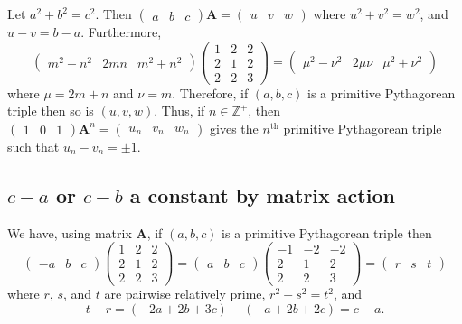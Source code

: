 \documentclass{article}
\theoremstyle{definition}
\begin{document}
Let \(a^2+b^2=c^2\). Then \( \begin{pmatrix}a&b&c\end{pmatrix}\mathbf{A}=\begin{pmatrix}u&v&w\end{pmatrix}\) where \(u^2+v^2=w^2\), and \(u-v=b-a\). Furthermore,\[ \begin{pmatrix}
m^2-n^2&2mn&m^2+n^2
\end{pmatrix}\begin{pmatrix} 1 & 2 & 2 \\ 2 & 1 & 2 \\ 2 & 2 & 3 \end{pmatrix}= \begin{pmatrix} \mu^2-\nu^2 & 2\mu\nu & \mu^2+\nu^2 \end{pmatrix} \] where \(\mu=2m+n\) and \(\nu=m\). Therefore, if \((a,b,c)\) is a primitive Pythagorean triple then so is \((u,v,w)\). Thus, if  \(n\in
\mathbb{Z}^+ \), then \(\begin{pmatrix}1 & 0 & 1\end{pmatrix}\mathbf{A}^n = \begin{pmatrix}u_n & v_n & w_n\end{pmatrix}\) gives the \(n^{\mathrm{th}}\) primitive Pythagorean triple such that \(u_n-v_n=\pm 1\).

\subsection{\(c-a\) or \(c-b\) a constant by matrix action}

We have, using matrix \(\mathbf{A}\), if \((a,b,c)\) is a primitive Pythagorean triple then \[ \begin{pmatrix} -a&b&c \end{pmatrix} \begin{pmatrix} 1&2&2 \\ 2&1&2 \\ 2&2&3 \end{pmatrix} = \begin{pmatrix} a&b&c \end{pmatrix} \begin{pmatrix} -1&-2&-2 \\ 2&1&2 \\ 2&2&3 \end{pmatrix} = \begin{pmatrix}r&s&t \end{pmatrix} \] where \(r\), \(s\), and \(t\) are pairwise relatively prime, \( r^2+s^2 = t^2\), and \[ t-r = (-2a+2b+3c)-(-a+2b+2c) = c-a.\]
\end{document}
